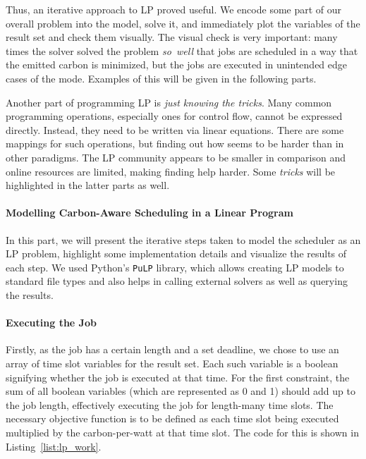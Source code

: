 Thus, an iterative approach to LP proved useful. 
We encode some part of our overall problem into the model, solve it, and immediately plot the variables of the result set and check them visually.
The visual check is very important: many times the solver solved the problem \emph{so~well} that jobs are scheduled in a way that the emitted carbon is minimized, but the jobs are executed in unintended edge cases of the mode.
Examples of this will be given in the following parts.

Another part of programming LP is \emph{just knowing the tricks}. 
Many common programming operations, especially ones for control flow, cannot be expressed directly.
Instead, they need to be written via linear equations.
There are some mappings for such operations, but finding out how seems to be harder than in other paradigms.
The LP community appears to be smaller in comparison and online resources are limited, making finding help harder.
Some \emph{tricks} will be highlighted in the latter parts as well. 

\paragraph{Modelling Carbon-Aware Scheduling in a Linear Program}

In this part, we will present the iterative steps taken to model the scheduler as an LP problem, highlight some implementation details and visualize the results of each step.
We used Python's \verb|PuLP| library, which allows creating LP models to standard file types and also helps in calling external solvers as well as querying the results.

\paragraph{Executing the Job}

Firstly, as the job has a certain length and a set deadline, we chose to use an array of time slot variables for the result set. Each such variable is a boolean signifying whether the job is executed at that time.
For the first constraint, the sum of all boolean variables (which are represented as 0 and 1) should add up to the job length, effectively executing the job for length-many time slots.
The necessary objective function is to be defined as each time slot being executed multiplied by the carbon-per-watt at that time slot.
The code for this is shown in Listing~\ref{list:lp_work}.

